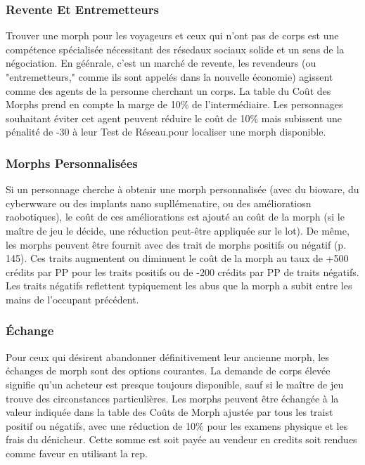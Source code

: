 \subsubsection{Revente Et Entremetteurs} 

Trouver une morph pour les voyageurs et ceux qui n'ont pas de corps est une compétence spécialisée nécessitant des résedaux sociaux solide et un sens de la négociation. En géénrale, c'est un marché de revente, les revendeurs (ou "entremetteurs," comme ils sont appelés dans la nouvelle économie) agissent comme des agents de la personne cherchant un corps. La table du Coût des Morphs prend en compte la marge de 10\% de l'intermédiaire. Les personnages souhaitant éviter cet agent peuvent réduire le coût de 10\% mais subissent une pénalité de -30 à leur Test de Réseau.pour localiser une morph disponible. 

\subsubsection{Morphs Personnalisées} 

Si un personnage cherche à obtenir une morph personnalisée (avec du bioware, du cyberwware ou des implants nano supllémenatire, ou des amélioratiosn raobotiques), le coût de ces améliorations est ajouté au coût de la morph (si le maître de jeu le décide, une réduction peut-être appliquée sur le lot). De même, les morphs peuvent être fournit avec des trait de morphs positifs ou négatif (p. 145). Ces traits augmentent ou diminuent le coût de la morph au taux de +500 crédits par PP pour les traits positifs ou de -200 crédits par PP de traits négatifs. Les traits négatifs reflettent typiquement les abus que la morph a subit entre les mains de l'occupant précédent. 

\subsubsection{Échange} 

Pour ceux qui désirent abandonner définitivement leur ancienne morph, les échanges de morph sont des options courantes. La demande de corps élevée signifie qu'un acheteur est presque toujours disponible, sauf si le maître de jeu trouve des circonstances particulières. Les morphs peuvent être échangée à la valeur indiquée dans la table des Coûts de Morph ajustée par tous les traist positif ou négatifs, avec une réduction de 10\% pour les examens physique et les frais du dénicheur. Cette somme est soit payée au vendeur en credits soit rendues comme faveur en utilisant la rep. 

